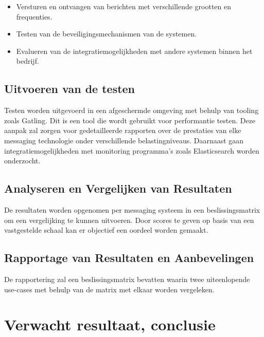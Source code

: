 \begin{itemize}
  \item Versturen en ontvangen van berichten met verschillende grootten en frequenties.
  \item Testen van de beveiligingsmechanismen van de systemen.
  \item Evalueren van de integratiemogelijkheden met andere systemen binnen het bedrijf.
 \end{itemize}

\subsection{Uitvoeren van de testen}
Testen worden uitgevoerd in een afgeschermde omgeving met behulp van tooling zoals Gatling.
Dit is een tool die wordt gebruikt voor performantie testen.
Deze aanpak zal zorgen voor gedetailleerde rapporten over de prestaties van elke messaging technologie onder verschillende belastingniveaus. 
Daarnaast gaan integratiemogelijkheden met monitoring programma's zoals Elasticsearch worden onderzocht.

\subsection{Analyseren en Vergelijken van Resultaten}
De resultaten worden opgenomen per messaging systeem in een beslissingsmatrix om een vergelijking te kunnen uitvoeren. 
Door scores te geven op basis van een vastgestelde schaal kan er objectief een oordeel worden gemaakt.

\subsection{Rapportage van Resultaten en Aanbevelingen}
De rapportering zal een beslissingsmatrix bevatten waarin twee uiteenlopende use-cases met behulp van de 
matrix met elkaar worden vergeleken.

\section{Verwacht resultaat, conclusie}%
\label{sec:verwachte_resultaten}



